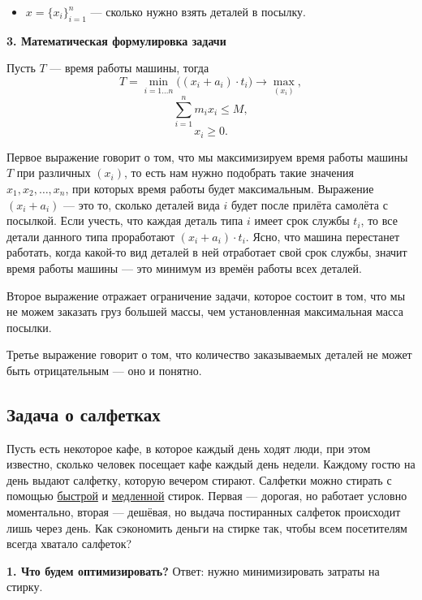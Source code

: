 \begin{itemize}[nosep]	
	\item $x = \{x_i\}_{i=1}^n$ --- сколько нужно взять деталей в посылку.
\end{itemize}

\bigskip

\textbf{3. Математическая формулировка задачи}

Пусть $T$ --- время работы машины, тогда
\[T = \min_{i = 1 \dots n} \big((x_i + a_i) \cdot t_i\big) \to \max_{(x_i)},\]
\[\sum_{i=1}^{n} m_i x_i \le M,\]
\[x_i \ge 0.\]

Первое выражение говорит о том, что мы максимизируем время работы машины $T$ при различных $(x_i)$, то есть нам нужно подобрать такие значения $x_1, x_2, \dots, x_n$, при которых время работы будет максимальным. Выражение $(x_i + a_i)$ --- это то, сколько деталей вида $i$ будет после прилёта самолёта с посылкой. Если учесть, что каждая деталь типа $i$ имеет срок службы $t_i$, то все детали данного типа проработают $(x_i + a_i) \cdot t_i$. Ясно, что машина перестанет работать, когда какой-то вид деталей в ней отработает свой срок службы, значит время работы машины --- это минимум из времён работы всех деталей.

Второе выражение отражает ограничение задачи, которое состоит в том, что мы не можем заказать груз большей массы, чем установленная максимальная масса посылки.

Третье выражение говорит о том, что количество заказываемых деталей не может быть отрицательным --- оно и понятно.

\subsection{Задача о салфетках}

\problem\label{pr:napkins}

Пусть есть некоторое кафе, в которое каждый день ходят люди, при этом известно, сколько человек посещает кафе каждый день недели. Каждому гостю на день выдают салфетку, которую вечером стирают. Салфетки можно стирать с помощью \underline{быстрой} и \underline{медленной} стирок. Первая --- дорогая, но работает условно моментально, вторая --- дешёвая, но выдача постиранных салфеток происходит лишь через день. Как сэкономить деньги на стирке так, чтобы всем посетителям всегда хватало салфеток?

\mathmodel

\textbf{1. Что будем оптимизировать?} Ответ: нужно минимизировать затраты на стирку.

